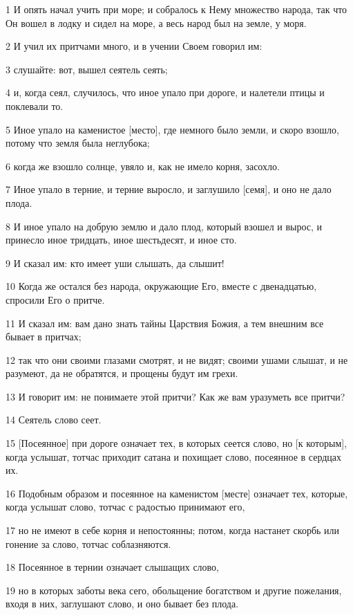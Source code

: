 \par 1 И опять начал учить при море; и собралось к Нему множество народа, так что Он вошел в лодку и сидел на море, а весь народ был на земле, у моря.
\par 2 И учил их притчами много, и в учении Своем говорил им:
\par 3 слушайте: вот, вышел сеятель сеять;
\par 4 и, когда сеял, случилось, что иное упало при дороге, и налетели птицы и поклевали то.
\par 5 Иное упало на каменистое [место], где немного было земли, и скоро взошло, потому что земля была неглубока;
\par 6 когда же взошло солнце, увяло и, как не имело корня, засохло.
\par 7 Иное упало в терние, и терние выросло, и заглушило [семя], и оно не дало плода.
\par 8 И иное упало на добрую землю и дало плод, который взошел и вырос, и принесло иное тридцать, иное шестьдесят, и иное сто.
\par 9 И сказал им: кто имеет уши слышать, да слышит!
\par 10 Когда же остался без народа, окружающие Его, вместе с двенадцатью, спросили Его о притче.
\par 11 И сказал им: вам дано знать тайны Царствия Божия, а тем внешним все бывает в притчах;
\par 12 так что они своими глазами смотрят, и не видят; своими ушами слышат, и не разумеют, да не обратятся, и прощены будут им грехи.
\par 13 И говорит им: не понимаете этой притчи? Как же вам уразуметь все притчи?
\par 14 Сеятель слово сеет.
\par 15 [Посеянное] при дороге означает тех, в которых сеется слово, но [к которым], когда услышат, тотчас приходит сатана и похищает слово, посеянное в сердцах их.
\par 16 Подобным образом и посеянное на каменистом [месте] означает тех, которые, когда услышат слово, тотчас с радостью принимают его,
\par 17 но не имеют в себе корня и непостоянны; потом, когда настанет скорбь или гонение за слово, тотчас соблазняются.
\par 18 Посеянное в тернии означает слышащих слово,
\par 19 но в которых заботы века сего, обольщение богатством и другие пожелания, входя в них, заглушают слово, и оно бывает без плода.
